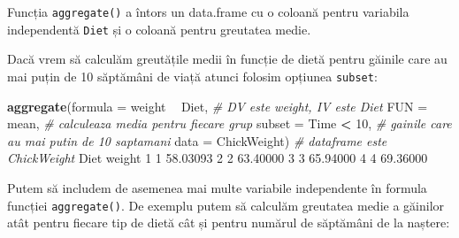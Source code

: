 \documentclass[]{article}
\newenvironment{Shaded}{\begin{snugshade}}{\end{snugshade}}
\newcommand{\KeywordTok}[1]{\textcolor[rgb]{0.13,0.29,0.53}{\textbf{#1}}}
\newcommand{\DataTypeTok}[1]{\textcolor[rgb]{0.13,0.29,0.53}{#1}}
\newcommand{\DecValTok}[1]{\textcolor[rgb]{0.00,0.00,0.81}{#1}}
\newcommand{\FloatTok}[1]{\textcolor[rgb]{0.00,0.00,0.81}{#1}}
\newcommand{\StringTok}[1]{\textcolor[rgb]{0.31,0.60,0.02}{#1}}
\newcommand{\CommentTok}[1]{\textcolor[rgb]{0.56,0.35,0.01}{\textit{#1}}}
\newcommand{\OperatorTok}[1]{\textcolor[rgb]{0.81,0.36,0.00}{\textbf{#1}}}
\newcommand{\NormalTok}[1]{#1}
\begin{document}
Funcția \texttt{aggregate()} a întors un data.frame cu o coloană pentru
variabila independentă \texttt{Diet} și o coloană pentru greutatea
medie.

Dacă vrem să calculăm greutățile medii în funcție de dietă pentru
găinile care au mai puțin de 10 săptămâni de viață atunci folosim
opțiunea \texttt{subset}:

\begin{Shaded}
\begin{Highlighting}[]
\KeywordTok{aggregate}\NormalTok{(}\DataTypeTok{formula =}\NormalTok{ weight }\OperatorTok{~}\StringTok{ }\NormalTok{Diet,  }\CommentTok{# DV este weight, IV este Diet}
          \DataTypeTok{FUN =}\NormalTok{ mean,               }\CommentTok{# calculeaza media pentru fiecare grup}
          \DataTypeTok{subset =}\NormalTok{ Time }\OperatorTok{<}\StringTok{ }\DecValTok{10}\NormalTok{,       }\CommentTok{# gainile care au mai putin de 10 saptamani}
          \DataTypeTok{data =}\NormalTok{ ChickWeight)       }\CommentTok{# dataframe este ChickWeight}
\NormalTok{  Diet   weight}
\DecValTok{1}    \DecValTok{1} \FloatTok{58.03093}
\DecValTok{2}    \DecValTok{2} \FloatTok{63.40000}
\DecValTok{3}    \DecValTok{3} \FloatTok{65.94000}
\DecValTok{4}    \DecValTok{4} \FloatTok{69.36000}
\end{Highlighting}
\end{Shaded}

Putem să includem de asemenea mai multe variabile independente în
formula funcției \texttt{aggregate()}. De exemplu putem să calculăm
greutatea medie a găinilor atât pentru fiecare tip de dietă cât și
pentru numărul de săptămâni de la naștere:
\end{document}
